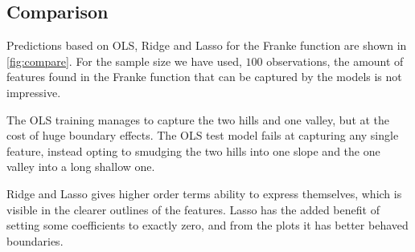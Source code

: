\subsection{Comparison}

Predictions based on OLS, Ridge and Lasso for the Franke function are shown in
\cref{fig:compare}. For the sample size we have used, \(100\) observations, the
amount of features found in the Franke function that can be captured by the
models is not impressive.

The OLS training manages to capture the two hills and one valley, but at the
cost of huge boundary effects. The OLS test model fails at capturing any single
feature, instead opting to smudging the two hills into one slope and the one
valley into a long shallow one.

Ridge and Lasso gives higher order terms ability to express themselves, which is visible
in the clearer outlines of the features. Lasso has the added benefit of setting
some coefficients to exactly zero, and from the plots it has better behaved
boundaries.
